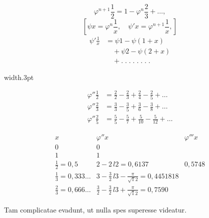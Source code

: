 \noindent\begin{minipage}[t]{.50\linewidth}
\small
\begin{equation*}\tag*{[4]}\varphi^{n+1}\frac12=1-\varphi^n\frac23+\ldots,\end{equation*}
\[
\left[\psi x=\varphi^n\frac1x,\quad\psi'x=\varphi^{n+1}\frac1x,\right]
\]
\[
\begin{aligned}
\psi'\frac1x&=\psi1-\psi(1+x)\\
&\quad+\psi2-\psi(2+x)\\
&\quad+\mathord{.}\;\mathord{.}\;\mathord{.}\;\mathord{.}\;\mathord{.}\;\mathord{.}\;\mathord{.}\;\mathord{.}
\end{aligned}
\]
\end{minipage}\hfill\vrule width.3pt\hfill\begin{minipage}[t]{.45\linewidth}
\small
\[
\begin{aligned}
\varphi''\frac12&=\frac22-\frac23+\frac24-\frac25+\ldots\\[1ex]
\varphi''\frac23&=\frac33-\frac35+\frac36-\frac38+\ldots\\[1ex]
\varphi''\frac25&=\frac55-\frac57+\frac5{10}-\frac5{12}+\ldots
\end{aligned}
\]
\end{minipage}
\par{}
\par\endgroup

\clearpage{}
\begingroup
\renewcommand{\arraystretch}{1.8}
\[
\begin{array}{c|c|c}
x&\varphi''x&\varphi'''x\\\hline
0&0&\\
1&1&\\
\frac12=0{,}5&2-2\,l2=0{,}6137&0{,}5748\\
\frac13=0{,}333\ldots&3-\frac32\,l3-\frac\pi{\surd12}=0{,}4451818&\\
\frac23=0{,}666\ldots&\frac32-\frac32\,l3+\frac\pi{\surd12}=0{,}7590&
\end{array}
\]
\endgroup
\noindent{\small[S. 4]}\par
\noindent\hspace*{\parindent}Tam complicatae evadunt, ut nulla spes superesse videatur.
\ClosingRule

